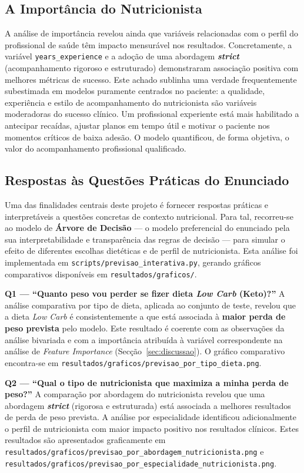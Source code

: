 \subsection{A Import\^ancia do Nutricionista}

A análise de importância revelou ainda que variáveis relacionadas com o perfil do profissional de saúde têm impacto mensurável nos resultados. Concretamente, a variável \texttt{years\_experience} e a adoção de uma abordagem \textbf{\textit{strict}} (acompanhamento rigoroso e estruturado) demonstraram associação positiva com melhores métricas de sucesso. Este achado sublinha uma verdade frequentemente subestimada em modelos puramente centrados no paciente: a qualidade, experiência e estilo de acompanhamento do nutricionista são variáveis moderadoras do sucesso clínico. Um profissional experiente está mais habilitado a antecipar recaídas, ajustar planos em tempo útil e motivar o paciente nos momentos críticos de baixa adesão. O modelo quantificou, de forma objetiva, o valor do acompanhamento profissional qualificado.

\subsection{Respostas \`as Quest\~oes Pr\'aticas do Enunciado}

Uma das finalidades centrais deste projeto é fornecer respostas práticas e interpretáveis a questões concretas de contexto nutricional. Para tal, recorreu-se ao modelo de \textbf{Árvore de Decisão} --- o modelo preferencial do enunciado pela sua interpretabilidade e transparência das regras de decisão --- para simular o efeito de diferentes escolhas dietéticas e de perfil de nutricionista. Esta análise foi implementada em \texttt{scripts/previsao\_interativa.py}, gerando gráficos comparativos disponíveis em \texttt{resultados/graficos/}.

\textbf{Q1 --- ``Quanto peso vou perder se fizer dieta \textit{Low Carb} (Keto)?''} A análise comparativa por tipo de dieta, aplicada ao conjunto de teste, revelou que a dieta \textit{Low Carb} é consistentemente a que está associada à \textbf{maior perda de peso prevista} pelo modelo. Este resultado é coerente com as observações da análise bivariada e com a importância atribuída à variável correspondente na análise de \textit{Feature Importance} (Secção~\ref{sec:discussao}). O gráfico comparativo encontra-se em \texttt{resultados/graficos/previsao\_por\_tipo\_dieta.png}.

\textbf{Q2 --- ``Qual o tipo de nutricionista que maximiza a minha perda de peso?''} A comparação por abordagem do nutricionista revelou que uma abordagem \textbf{\textit{strict}} (rigorosa e estruturada) está associada a melhores resultados de perda de peso prevista. A análise por especialidade identificou adicionalmente o perfil de nutricionista com maior impacto positivo nos resultados clínicos. Estes resultados são apresentados graficamente em \texttt{resultados/graficos/previsao\_por\_abordagem\_nutricionista.png} e \texttt{resultados/graficos/previsao\_por\_especialidade\_nutricionista.png}.

